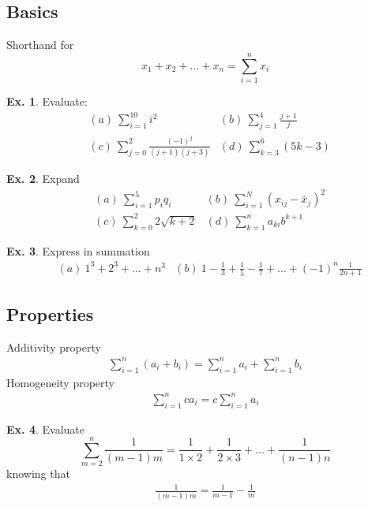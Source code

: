 \documentclass[10pt,a4paper]{book}
\theoremstyle{definition}\newtheorem{definition}{Definition}
\theoremstyle{definition}\newtheorem{fact}{Fact}
\theoremstyle{definition}\newtheorem{ex}{Ex.}
\theoremstyle{definition}\newtheorem{project}{Project}
\theoremstyle{definition}\newtheorem{problem}{Problem}
\theoremstyle{definition}\newtheorem{example}{Example}
\numberwithin{theorem}{chapter}
\numberwithin{corollary}{chapter}
\numberwithin{assumption}{chapter}
\numberwithin{definition}{chapter}
\numberwithin{prop}{chapter}
\numberwithin{notation}{chapter}
\numberwithin{problem}{chapter}
\numberwithin{example}{chapter}
\numberwithin{fact}{chapter}
\numberwithin{ex}{chapter}
\begin{document}
	\subsection{Basics}
	Shorthand for
	\begin{equation*}
		x_1 + x_2 + \dots + x_n = \sum^{n}_{i=1} x_i
	\end{equation*}
	
	\begin{ex}
		Evaluate:
		\begin{align*}
			& (a) \ \sum^{10}_{i=1} i^2                    
			& (b) \ \sum^{4}_{j=1} \frac{j+1}{j}           \\
			& (c) \ \sum^2_{j=0} \frac{(-1)^j}{(j+1)(j+3)} 
			& (d) \ \sum^{6}_{k=3} (5k-3)                  
		\end{align*}	
	\end{ex}
	
	\begin{ex}
		Expand
		\begin{align*}
			& (a) \ \sum^5_{i=1} p_i q_i                
			& (b) \ \sum^N_{i=1} (x_{ij} - \bar{x}_j)^2 \\
			& (c) \ \sum^2_{k=0} 2\sqrt{k+2}            
			& (d) \ \sum^n_{k=1} a_{ki} b^{k+1}         
		\end{align*}	
	\end{ex}
	
	\begin{ex}
		Express in summation
		\begin{align*}
			& (a) \ 1^3 + 2^3 + \dots + n^3                                                    
			& (b) \ 1 - \frac{1}{3} + \frac{1}{5} - \frac{1}{7} + \dots + (-1)^n\frac{1}{2n+1} 
		\end{align*}
	\end{ex}
	
	\subsection{Properties}
	Additivity property
	\begin{align*}
		\sum^n_{i=1} (a_i + b_i) = \sum^n_{i=1} a_i + \sum^n_{i=1} b_i 
	\end{align*}
	Homogeneity property
	\begin{align*}
		\sum^n_{i=1} c a_i = c \sum^n_{i=1} a_i 
	\end{align*}
	
	\begin{ex}
		Evaluate
		\begin{equation*}
			\sum^n_{m=2} \frac{1}{(m-1)m} = \frac{1}{1\times 2} + \frac{1}{2\times 3} + \dots + \frac{1}{(n-1)n}
		\end{equation*}
		knowing that
		\begin{align*}
			\frac{1}{(m-1)m} = \frac{1}{m-1} - \frac{1}{m} 
		\end{align*}
	\end{ex}
	
\end{document}
